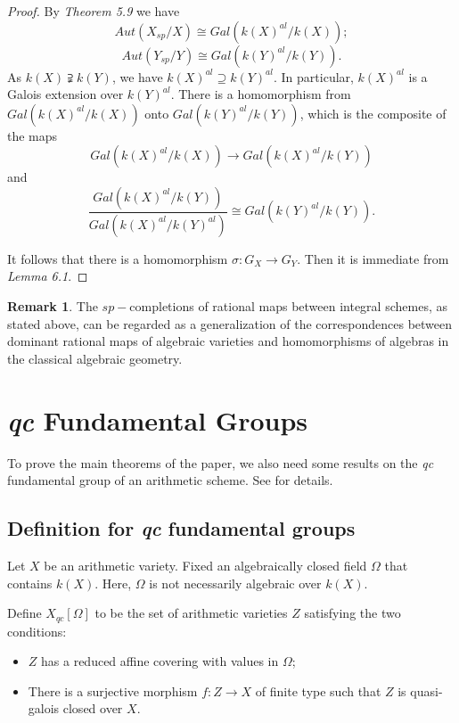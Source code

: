 \documentclass[12pt,twoside,reqno]{amsart}
\theoremstyle{definition}
\newtheorem{remark}[theorem]{Remark}
\numberwithin{equation}{section}
\begin{document}
\begin{proof}
By \emph{Theorem 5.9} we have $$Aut(X_{sp}/X)\cong Gal(k(X)^{al}/k(X));$$ $$Aut(Y_{sp}/Y)\cong Gal(k(Y)^{al}/k(Y)).$$
As $k(X) \supsetneqq k(Y)$, we have $k(X)^{al} \supseteq k(Y)^{al}$. In particular, $k(X)^{al}$ is a Galois extension over $k(Y)^{al}$. There is a homomorphism from ${Gal(k(X)^{al}/k(X))} $ onto $Gal(k(Y)^{al}/k(Y))$, which  is the composite of the maps $$Gal(k(X)^{al}/k(X)) \to {Gal(k(X)^{al}/k(Y))}$$
and
$$\frac {Gal(k(X)^{al}/k(Y))} {Gal(k(X)^{al}/k(Y)^{al})}\cong Gal(k(Y)^{al}/k(Y)).$$

It follows that there is a homomorphism $\sigma: G_{X}\to G_{Y}$. Then it is immediate from \emph{Lemma 6.1}.
\end{proof}


\begin{remark}
The $sp-$completions of rational maps between integral schemes, as stated above, can be regarded as a generalization of the correspondences between dominant rational maps of algebraic varieties and homomorphisms of algebras in the classical algebraic geometry.
\end{remark}


\section{\emph{qc} Fundamental Groups}

To prove the main theorems of the paper, we also need some results on the \emph{qc} fundamental group of an arithmetic scheme. See \cite{An5} for details.

\subsection{Definition for \emph{qc} fundamental groups}

Let $X$ be an arithmetic variety. Fixed an algebraically closed field $
\Omega $ that contains  $k\left( X\right) $. Here, $\Omega $ is not necessarily algebraic over $k\left(
X\right) .$

Define $X_{qc}\left[ \Omega \right] $ to be the set of arithmetic varieties $Z$ satisfying the two conditions:
\begin{itemize}
\item $Z$ has a reduced
affine covering with values in $\Omega $;

\item There is a
surjective morphism $f:Z\rightarrow X$ of finite type such that $Z$ is
quasi-galois closed over $X.$
\end{itemize}
\end{document}
